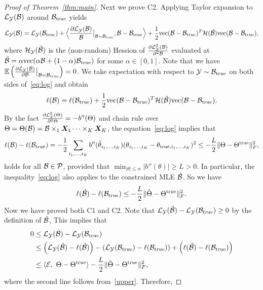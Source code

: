 \documentclass[12pt]{article}
\theoremstyle{plain}
\theoremstyle{definition}
\begin{document}
\begin{proof}[Proof of Theorem~\ref{thm:main}]
Next we prove C2. Applying Taylor expansion to $\mathcal{L}_{\mathcal{Y}}(\mathcal{B})$ around $\mathcal{B}_{\text{true}}$ yields
\begin{equation}\label{eq:logbefore}
\mathcal{L}_{\mathcal{Y}}(\mathcal{B})=\mathcal{L}_{\mathcal{Y}}(\mathcal{B}_{\text{true}})+\Big\langle {\partial\mathcal{L}_{\mathcal{Y}}(\mathcal{B}) \over \mathcal{B}}\big|_{\mathcal{B}=\mathcal{B}_{\text{true}}},\mathcal{B}-\mathcal{B}_{\text{true}} \Big\rangle + {1\over 2}\text{vec}(\mathcal{B}-\mathcal{B}_{\text{true}})^T \mathcal{H}(\check {\mathcal{B}})\text{vec}(\mathcal{B}-\mathcal{B}_{\text{true}}),
\end{equation}
where $\mathcal{H}_{\mathcal{Y}}(\check {\mathcal{B}})$ is the (non-random) Hession of ${\partial \mathcal{L}_{\mathcal{Y}}^2 (\mathcal{B})\over\partial^2 \mathcal{B}}$ evaluated at $\check {\mathcal{B}} =\alpha \text{vec}(\alpha \mathcal{B}+(1-\alpha)\mathcal{B}_{\text{true}})$ for some $\alpha\in[0,1]$. Note that we have $\mathbb{E}\left({\partial\mathcal{L}_{\mathcal{Y}}(\mathcal{B}) \over \partial \mathcal{B}}\big|_{\mathcal{B}=\mathcal{B}_{\text{true}}}\right)=0$. We take expectation with respect to $\mathcal{Y}\sim \mathcal{B}_{\text{true}}$ on both sides of~\eqref{eq:log} and obtain
\begin{equation}\label{eq:log}
\ell(\mathcal{B})=\ell(\mathcal{B}_{\text{true}})+{1\over 2}\text{vec}(\mathcal{B}-\mathcal{B}_{\text{true}})^T \mathcal{H}(\check {\mathcal{B}})\text{vec}(\mathcal{B}-\mathcal{B}_{\text{true}}).
\end{equation}
By the fact ${\partial \mathcal{L}_{\mathcal{Y}}^2(\Theta)\over \partial^2 \Theta}=-b''(\Theta)$ and chain rule over $\Theta=\Theta(\mathcal{B})=\mathcal{B}\times_1\bm X_1\cdots\times_K\bm X_K$, the equation~\eqref{eq:log} implies that 
\begin{equation}\label{eq:logB}
\ell(\mathcal{B})-\ell(\mathcal{B}_{\text{true}})=-{1\over 2}\sum_{i_1,\ldots,i_K}b''(\check \theta_{i_1,\ldots,i_K}) (\theta_{i_1,\ldots,i_K}-\theta_{\text{true},i_1,\ldots,i_K})^2 \leq -{L \over 2}\lVert\Theta-\Theta^{\text{true}}\rVert_F^2,
\end{equation}
holds for all $\mathcal{B}\in\mathcal{P}$, provided that $\min_{|\theta|\leq \alpha}|b''(\theta)|\geq L>0$. In particular, the inequality~\eqref{eq:log} also applies to the constrained MLE $\hat {\mathcal{B}}$. So we have
\begin{equation}\label{upper}
\ell(\hat {\mathcal{B}})-\ell(\mathcal{B}_{\text{true}})\leq -{L \over 2}\lVert\hat \Theta-\Theta^{\text{true}}\rVert_F^2.
\end{equation}
Now we have proved both C1 and C2. Note that $\mathcal{L}_{\mathcal{Y}}(\hat {\mathcal{B}})- \mathcal{L}_{\mathcal{Y}}(\mathcal{B}_{\text{true}})\geq 0$ by the definition of $\hat {\mathcal{B}}$, This implies that
\begin{align}
0&\leq \mathcal{L}_{\mathcal{Y}}(\hat {\mathcal{B}})- \mathcal{L}_{\mathcal{Y}}(\mathcal{B}_{\text{true}}) \\
&\leq \left(\mathcal{L}_{\mathcal{Y}}(\hat {\mathcal{B}})-\ell(\hat {\mathcal{B}})\right)-\left( \mathcal{L}_{\mathcal{Y}}(\mathcal{B}_{\text{true}})-\ell(\mathcal{B}_{\text{true}})\right)+\left(\ell(\hat {\mathcal{B}})-\ell(\mathcal{B}_{\text{true}})\right)\\
&\leq \langle\mathcal{E},\ \Theta-\Theta^{\text{true}}    \rangle -{L\over 2}\lVert\hat \Theta-\Theta^{\text{true}}\rVert_F^2,
\end{align}
where the second line follows from~\eqref{upper}. Therefore,

\end{proof}
\end{document}
